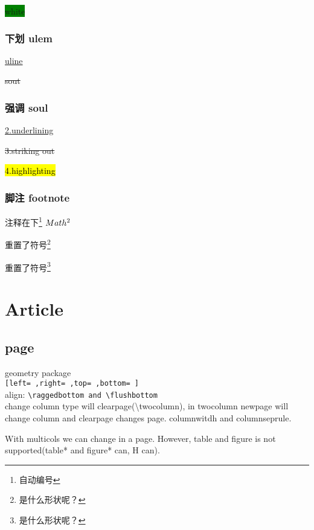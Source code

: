 \documentclass{article}
\begin{document}
		\colorbox{green}{\color{white}white}


		\newcommand{\red}[1]{\textcolor{red}{#1}}
		\newcommand{\blue}[1]{\textcolor{cyan}{#1}}
		\newcommand{\yellow}[1]{\textcolor{yellow}{#1}}
	\subsubsection{下划 ulem}
		\uline{uline}\par
		\par
		\par
		\sout{sout}\par
		\par
		\par
		\par
	\subsubsection{强调 soul}

		\ul{2.underlining}

		\st{3.striking out}

		\hl{4.highlighting}

	\subsubsection{脚注 footnote}
		注释在下\footnote{自动编号}
		$Math\footnotemark[2]$

		
		重置了符号\footnote{是什么形状呢？}
		
		\setcounter{footnote}{0}
		\renewcommand{\thefootnote}{\Alph{footnote}} 
		重置了符号\footnote{是什么形状呢？}

\section{Article}
\subsection{page}
    geometry package\\
    \verb|[left= ,right= ,top= ,bottom= ]|\\
    align: \verb|\raggedbottom and \flushbottom|\\
    change column type will clearpage(\textbackslash twocolumn), in twocolumn newpage will change column and clearpage changes page. columnwitdh and columnseprule.\\
    \addtolength{\columnseprule}{1ex}
    \begin{multicols}{3}
        With multicols we can change in a page. However, table and figure is not supported(table* and figure* can, H can).
    \end{multicols}
\end{document}
